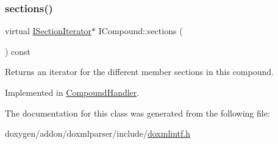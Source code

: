 \mbox{\label{class_i_compound_a966a7cac6a4f33f16ef869e74855ab3b}} 
\subsubsection{\texorpdfstring{sections()}{sections()}\hspace{0.1cm}{\footnotesize\ttfamily [2/2]}}
{\footnotesize\ttfamily virtual \mbox{\hyperlink{class_i_section_iterator}{I\+Section\+Iterator}}$\ast$ I\+Compound\+::sections (\begin{DoxyParamCaption}{ }\end{DoxyParamCaption}) const\hspace{0.3cm}{\ttfamily [pure virtual]}}

Returns an iterator for the different member sections in this compound. 

Implemented in \mbox{\hyperlink{class_compound_handler_ac692ed207cfa36644d6844e77d6d4fc2}{Compound\+Handler}}.



The documentation for this class was generated from the following file\+:\begin{DoxyCompactItemize}
\item 
doxygen/addon/doxmlparser/include/\mbox{\hyperlink{include_2doxmlintf_8h}{doxmlintf.\+h}}\end{DoxyCompactItemize}
